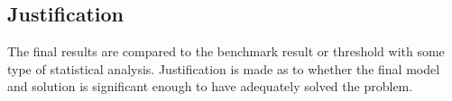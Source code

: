 \subsection{Justification}
The final results are compared to the benchmark result or threshold with some type of statistical analysis. Justification is made as to whether the final model and solution is significant enough to have adequately solved the problem.
